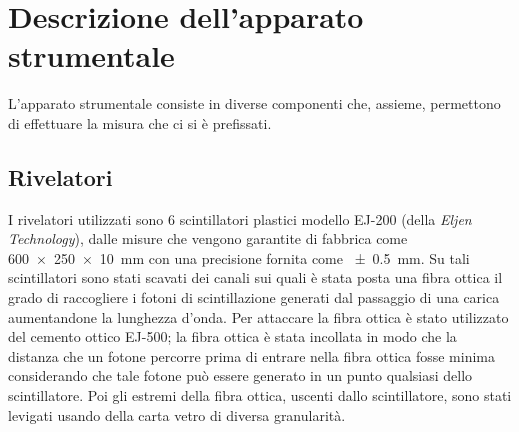 \section{Descrizione dell'apparato strumentale}
L'apparato strumentale consiste in diverse componenti che, assieme, permettono di effettuare la misura che ci si è prefissati. 
\subsection{Rivelatori}
I rivelatori utilizzati sono 6 scintillatori plastici modello EJ-200 (della \textit{Eljen Technology}), dalle misure che vengono garantite di fabbrica come
\SI{600x250x10}{\milli\m} con una precisione fornita come \SI{\pm 0.5}{\milli\m}. Su tali scintillatori sono stati scavati dei canali sui quali è stata  posta una fibra ottica il grado di raccogliere
i fotoni di scintillazione generati dal passaggio di una carica aumentandone la lunghezza d'onda. Per attaccare la fibra ottica è stato utilizzato del cemento ottico EJ-500; la fibra ottica è stata
incollata in modo che la distanza che un fotone percorre prima di entrare nella fibra ottica fosse minima considerando che tale fotone può essere generato in un punto qualsiasi
dello scintillatore. Poi gli estremi della fibra ottica, uscenti dallo scintillatore, sono stati levigati usando della carta vetro di diversa granularit\`a.\\

